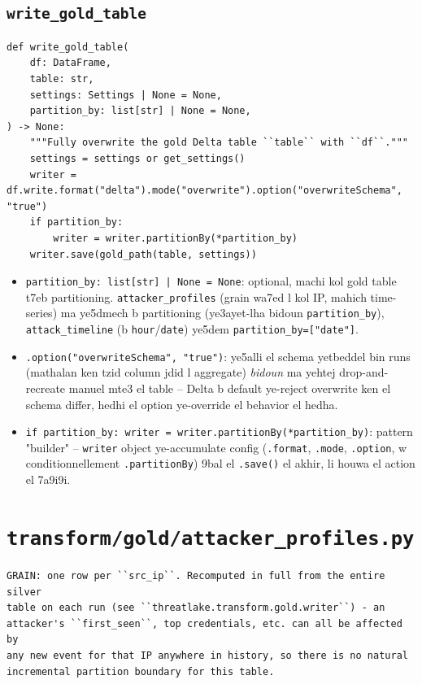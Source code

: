 \documentclass[11pt,a4paper]{report}
\DeclareRobustCommand{\code}[1]{\texttt{#1}}
\DeclareRobustCommand{\file}[1]{\texttt{\color{amber}#1}}
\begin{document}
\subsection{\code{write\_gold\_table}}

\begin{lstlisting}[style=pystyle]
def write_gold_table(
    df: DataFrame,
    table: str,
    settings: Settings | None = None,
    partition_by: list[str] | None = None,
) -> None:
    """Fully overwrite the gold Delta table ``table`` with ``df``."""
    settings = settings or get_settings()
    writer = df.write.format("delta").mode("overwrite").option("overwriteSchema", "true")
    if partition_by:
        writer = writer.partitionBy(*partition_by)
    writer.save(gold_path(table, settings))
\end{lstlisting}

\begin{itemize}
  \item \code{partition\_by: list[str] | None = None}: optional, machi
        kol gold table t7eb partitioning. \code{attacker\_profiles} (grain
        wa7ed l kol IP, mahich time-series) ma ye5dmech b partitioning
        (ye3ayet-lha bidoun \code{partition\_by}), \code{attack\_timeline}
        (b \code{hour}/\code{date}) ye5dem \code{partition\_by=["date"]}.
  \item \code{.option("overwriteSchema", "true")}: ye5alli el schema
        yetbeddel bin runs (mathalan ken tzid column jdid l aggregate)
        \emph{bidoun} ma yehtej drop-and-recreate manuel mte3 el table --
        Delta b default ye-reject overwrite ken el schema differ, hedhi
        el option ye-override el behavior el hedha.
  \item \code{if partition\_by: writer = writer.partitionBy(*partition\_by)}:
        pattern "builder" -- \code{writer} object ye-accumulate config
        (\code{.format}, \code{.mode}, \code{.option}, w conditionnellement
        \code{.partitionBy}) 9bal el \code{.save()} el akhir, li houwa
        el action el 7a9i9i.
\end{itemize}

\section{\file{transform/gold/attacker\_profiles.py}}

\begin{lstlisting}[style=pystyle]
GRAIN: one row per ``src_ip``. Recomputed in full from the entire silver
table on each run (see ``threatlake.transform.gold.writer``) - an
attacker's ``first_seen``, top credentials, etc. can all be affected by
any new event for that IP anywhere in history, so there is no natural
incremental partition boundary for this table.
\end{lstlisting}
\end{document}
